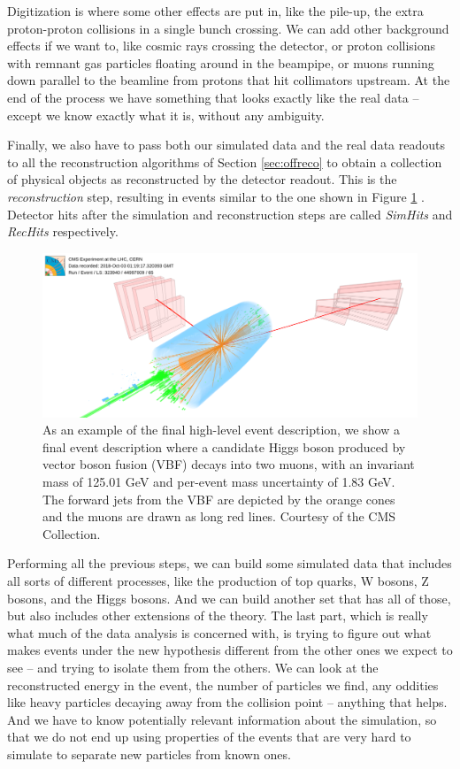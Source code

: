 Digitization is where some other effects are put in, like the pile-up, the extra proton-proton collisions in a single bunch crossing. We can add other background effects if we want to, like cosmic rays crossing the detector, or proton collisions with remnant gas particles floating around in the beampipe, or muons running down parallel to the beamline from protons that hit collimators upstream. 
At the end of the process we have something that looks exactly like the real data – except we know exactly what it is, without any ambiguity.

Finally, we also have to pass both our simulated data and the real data readouts to all the reconstruction algorithms of Section \ref{sec:offreco} to obtain a collection of physical objects as reconstructed by the detector readout. This is the \emph{reconstruction} step, resulting in events similar to the one shown in Figure \ref{fig:cmsev} . Detector hits after the simulation and reconstruction steps are called \emph{SimHits}
and \emph{RecHits} respectively.

\begin{figure}
    \centering
     \includegraphics[width=\columnwidth]{gfx/ch2/HIG-19-006_VBF_white.png}
    \caption[CMS Event]{As an example of the final high-level event description, we show a final event description  where a candidate Higgs boson produced by vector boson fusion (VBF) decays into two muons, with an invariant mass of 125.01 GeV and per-event mass uncertainty of 1.83 GeV. The forward jets from the VBF are depicted by the orange cones and the muons are drawn as long red lines. Courtesy of the CMS Collection.}
    \label{fig:cmsev}
\end{figure}


Performing all the previous steps, we can build some simulated data that includes all sorts of different processes, like the production of top quarks, W bosons, Z bosons, and the Higgs bosons. And we can build another set that has all of those, but also includes other extensions of the theory. The last part, which is really what much of the data analysis is concerned with, is trying to figure out what makes events under the new hypothesis different from the other ones we expect to see – and trying to isolate them from the others. We can look at the reconstructed energy in the event, the number of particles we find, any oddities like heavy particles decaying away from the collision point – anything that helps. And we have to know potentially relevant information about the simulation, so that we do not end up using properties of the events that are very hard to simulate to separate new particles from known ones. 

